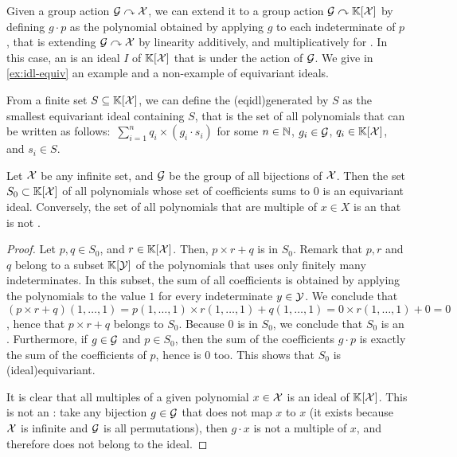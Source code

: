 Given a group action $\mathcal{G} \curvearrowright \mathcal{X}$, we can extend it to a group
action $\mathcal{G} \curvearrowright \mathbb{K}[\mathcal{X}]$ by defining $g \cdot p$ as the
polynomial obtained by applying $g$ to each indeterminate of $p$, that is
extending $\mathcal{G} \curvearrowright \mathcal{X}$ by linearity additively, and
multiplicatively for . In this case, an 
is an ideal $I$ of $\mathbb{K}[\mathcal{X}]$ that is  under the action of
$\mathcal{G}$. We give in \cref{ex:idl-equiv} an example and a
non-example of equivariant ideals.

From a finite set $S \subseteq \mathbb{K}[\mathcal{X}]$, we can define the
 \kl(eqidl){generated by} $S$ as the smallest equivariant
ideal containing $S$, that is the set of all polynomials that can be written as
follows: $\,\sum_{i=1}^n q_i \times (g_i \cdot s_i)$ for some $n \in \mathbb{N}$, $g_i
\in \mathcal{G}$, $q_i \in \mathbb{K}[\mathcal{X}]$, and $s_i \in S$.


\begin{example}
    \label{ex:idl-equiv}
    Let $\mathcal{X}$ be any infinite set, and $\mathcal{G}$ be the 
    group of all bijections of $\mathcal{X}$. 
    Then the set $S_0 \subset \mathbb{K}[\mathcal{X}]$ of all polynomials 
    whose set of coefficients sums to $0$ is an equivariant ideal.
    Conversely, the set of all polynomials that are multiple
    of $x \in X$ is an  that is not .
\end{example}
\begin{proof}
    Let $p,q\in S_0$, and $r \in \mathbb{K}[\mathcal{X}]$.
    Then, $p \times r + q$ is in $S_0$. Remark that 
    $p,r$ and $q$ belong to a subset $\mathbb{K}[\mathcal{Y}]$ of the 
    polynomials that uses only finitely many indeterminates.
    In this subset, the sum of all coefficients is obtained
    by applying the polynomials to the value $1$ for every indeterminate
    $y \in \mathcal{Y}$. We conclude that
    $(p \times r + q)(1,\dots, 1) 
    = p(1,\dots,1) \times r(1,\dots,1) + q(1,\dots,1)
    = 0 \times r(1, \dots, 1) + 0 = 0$, hence that
    $p \times r + q$ belongs to $S_0$. 
    Because $0$ is in $S_0$, we conclude that $S_0$ is an .
    Furthermore, if $g \in \mathcal{G}$ and $p \in S_0$, then
    the sum of the coefficients $g \cdot p$ is exactly
    the sum of the coefficients of $p$, hence is $0$ too.
    This shows that $S_0$ is \kl(ideal){equivariant}.

    It is clear that all multiples of a given polynomial $x \in \mathcal{X}$
    is an ideal of $\mathbb{K}[\mathcal{X}]$. This is not an :
    take any bijection $g \in \mathcal{G}$ that does not map $x$ to $x$ (it
    exists because $\mathcal{X}$ is infinite and $\mathcal{G}$ is all permutations),
    then $g \cdot x$ is not a multiple of $x$, and therefore does 
    not belong to the ideal.
\end{proof}


